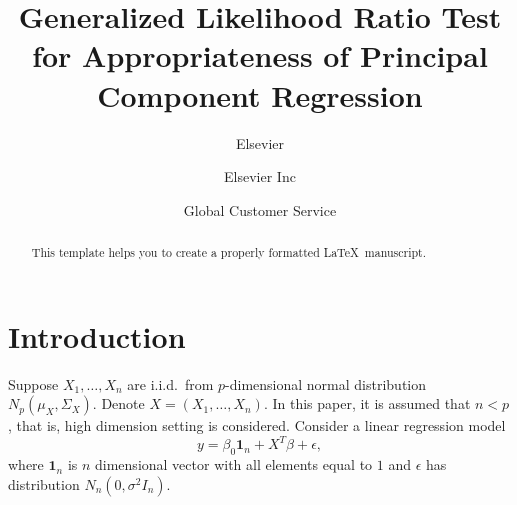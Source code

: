 \documentclass[review]{elsarticle}
\theoremstyle{plain}
\theoremstyle{definition}
\theoremstyle{remark}
\begin{document}
\begin{frontmatter}

\title{Generalized Likelihood Ratio Test for Appropriateness of Principal Component Regression}

\author{Elsevier}
\address{Radarweg 29, Amsterdam}

\author[mymainaddress,mysecondaryaddress]{Elsevier Inc}

\author[mysecondaryaddress]{Global Customer Service}

\address[mymainaddress]{1600 John F Kennedy Boulevard, Philadelphia}
\address[mysecondaryaddress]{360 Park Avenue South, New York}

\begin{abstract}
This template helps you to create a properly formatted \LaTeX\ manuscript.
\end{abstract}

\begin{keyword}
\end{keyword}

\end{frontmatter}


\section{Introduction}
Suppose $X_1,\ldots,X_n$ are i.i.d.\ from $p$-dimensional normal distribution $N_{p}(\mu_X,\Sigma_X)$. 
Denote $X=(X_1,\ldots,X_n)$.
In this paper, it is assumed that $n<p$, that is, high dimension setting is considered.
Consider a linear regression model 
\begin{equation}\label{regModel}
    y=\beta_0 \textbf{1}_n+X^T \beta+\epsilon,
\end{equation}
     where $\textbf{1}_n$ is $n$ dimensional vector with all elements equal to $1$ and $\epsilon$ has distribution $N_n(0,\sigma^2 I_n)$.
\end{document}
